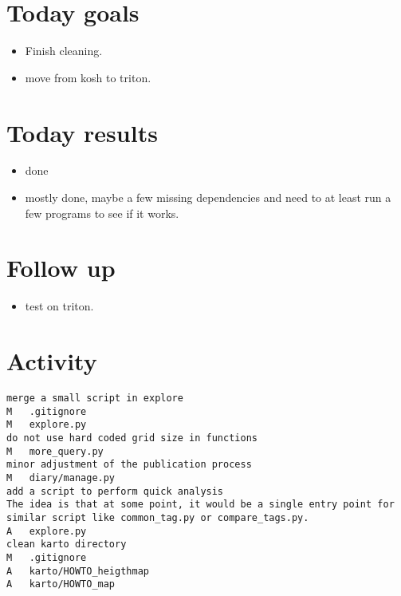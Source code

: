 \section*{Today goals}
\begin{itemize}
	\item Finish cleaning.
	\item move from kosh to triton.
\end{itemize}

\section*{Today results}
\begin{itemize}
	\item done
	\item mostly done, maybe a few missing dependencies and need to at least
		run a few programs to see if it works.
\end{itemize}

\section*{Follow up}
\begin{itemize}
	\item test on triton.
\end{itemize}

\section*{Activity}
\begin{verbatim}
merge a small script in explore
M	.gitignore
M	explore.py
do not use hard coded grid size in functions
M	more_query.py
minor adjustment of the publication process
M	diary/manage.py
add a script to perform quick analysis
The idea is that at some point, it would be a single entry point for
similar script like common_tag.py or compare_tags.py.
A	explore.py
clean karto directory
M	.gitignore
A	karto/HOWTO_heigthmap
A	karto/HOWTO_map
\end{verbatim}